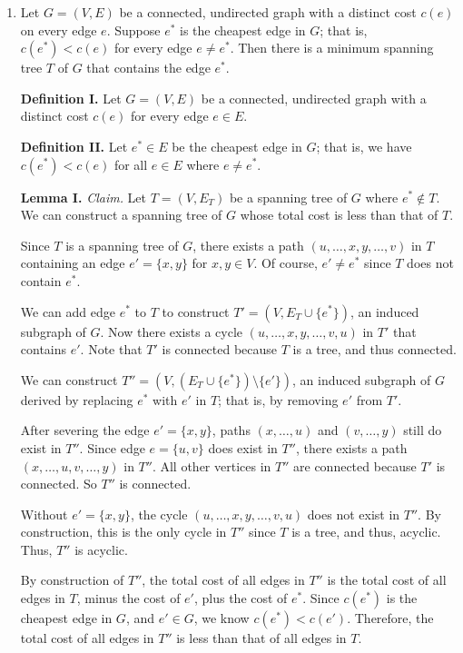 \begin{enumerate}
\item Let $G = (V, E)$ be a connected, undirected graph with a distinct cost $c(e)$ on every edge $e$. Suppose $e^*$ is the cheapest edge in $G$; that is, $c(e^*) < c(e)$ for every edge $e \neq e^*$. Then there is a minimum spanning tree $T$ of $G$ that contains the edge $e^*$.
\begin{solution}

\textbf{Definition I. }Let $G=(V,E)$ be a connected, undirected graph with a distinct cost $c(e)$ for every edge $e\in E$.

\textbf{Definition II. }Let $e^*\in E$ be the cheapest edge in $G$; that is, we have $c(e^*)<c(e)$ for all $e\in E$ where $e\neq e^*$.

\textbf{Lemma I. }\textit{Claim. }Let $T=(V,E_T)$ be a spanning tree of $G$ where $e^*\notin T$. We can construct a spanning tree of $G$ whose total cost is less than that of $T$.

Since $T$ is a spanning tree of $G$, there exists a path $(u,\dots,x,y,\dots,v)$ in $T$ containing an edge $e'=\{x,y\}$ for $x,y\in V$. Of course, $e'\neq e^*$ since $T$ does not contain $e^*$.

We can add edge $e^*$ to $T$ to construct $T'=(V,E_T\cup\{e^*\})$, an induced subgraph of $G$. Now there exists a cycle $(u,\dots,x,y,\dots,v,u)$ in $T'$ that contains $e'$. Note that $T'$ is connected because $T$ is a tree, and thus connected.

We can construct $T''=(V,(E_T\cup\{e^*\})\setminus\{e'\})$, an induced subgraph of $G$ derived by replacing $e^*$ with $e'$ in $T$; that is, by removing $e'$ from $T'$.

After severing the edge $e'=\{x,y\}$, paths $(x,\dots,u)$ and $(v,\dots,y)$ still do exist in $T''$. Since edge $e=\{u,v\}$ does exist in $T''$, there exists a path $(x,\dots,u,v,\dots,y)$ in $T''$. All other vertices in $T''$ are connected because $T'$ is connected. So $T''$ is connected. 

Without $e'=\{x,y\}$, the cycle $(u,\dots,x,y,\dots,v,u)$ does not exist in $T''$. By construction, this is the only cycle in $T''$ since $T$ is a tree, and thus, acyclic. Thus, $T''$ is acyclic.

By construction of $T''$, the total cost of all edges in $T''$ is the total cost of all edges in $T$, minus the cost of $e'$, plus the cost of $e^*$. Since $c(e^*)$ is the cheapest edge in $G$, and $e'\in G$, we know $c(e^*)<c(e')$. Therefore, the total cost of all edges in $T''$ is less than that of all edges in $T$.


\end{solution}
\end{enumerate}
